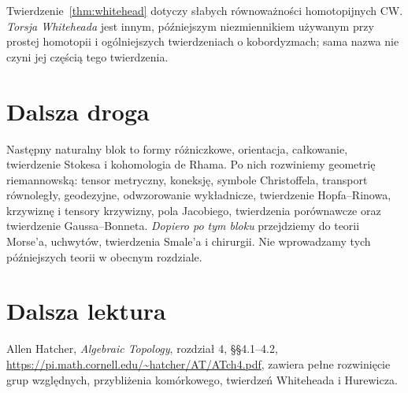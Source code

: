 \begin{uwaga}
Twierdzenie~\ref{thm:whitehead}
dotyczy słabych równoważności
homotopijnych CW.
\emph{Torsja Whiteheada}
jest innym, późniejszym
niezmiennikiem używanym
przy prostej homotopii
i ogólniejszych
twierdzeniach o
kobordyzmach; sama
nazwa nie czyni jej
częścią tego twierdzenia.
\end{uwaga}

\section*{Dalsza droga}
Następny naturalny blok to
formy różniczkowe,
orientacja, całkowanie,
twierdzenie Stokesa
i kohomologia de Rhama.
Po nich rozwiniemy
geometrię riemannowską:
tensor metryczny, koneksję,
symbole Christoffela,
transport równoległy,
geodezyjne, odwzorowanie
wykładnicze, twierdzenie
Hopfa--Rinowa, krzywiznę
i tensory krzywizny,
pola Jacobiego,
twierdzenia porównawcze
oraz twierdzenie
Gaussa--Bonneta.
\emph{Dopiero po tym bloku}
przejdziemy do teorii
Morse'a, uchwytów,
twierdzenia Smale'a
i chirurgii.
Nie wprowadzamy
tych późniejszych
teorii w obecnym rozdziale.

\section*{Dalsza lektura}
Allen Hatcher,
\emph{Algebraic Topology},
rozdział 4, §§4.1--4.2,
\url{https://pi.math.cornell.edu/~hatcher/AT/ATch4.pdf},
zawiera pełne rozwinięcie
grup względnych,
przybliżenia komórkowego,
twierdzeń Whiteheada
i Hurewicza.
\clearpage

